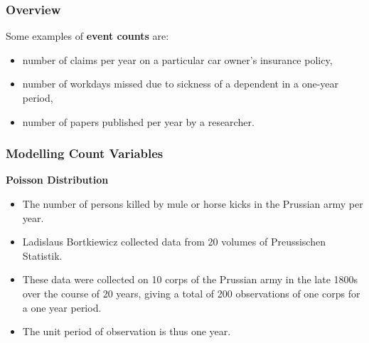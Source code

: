 \documentclass[MASTER.tex]{subfiles}
\begin{document}
%		
%		
\begin{frame}
	\frametitle{Overview}
\vspace{-0.5cm}
	\Large Some
examples of \textbf{ event counts } are:
\begin{itemize}
\item number of claims per year on a particular car owner’s insurance policy,
\item number of workdays missed due to sickness of a dependent in a one-year period,
\item number of papers published per year by a researcher.
\end{itemize}
\end{frame}
\begin{frame}[fragile]
	
	\frametitle{Modelling Count Variables } 
	\Large	
	\textbf{Poisson Distribution} 
	
	\begin{itemize}
		\item The number of persons killed by mule or horse kicks in the Prussian army per year. 
		\item Ladislaus Bortkiewicz collected data from 20 volumes of Preussischen Statistik. 
		\item These data were collected on 10 corps of the Prussian army in the late 1800s over the course of 20 years, giving a total of 200 observations of one corps for a one year period. \item The unit period of observation is thus one year. 
		
	\end{itemize}
	
\end{frame}
\end{document}
